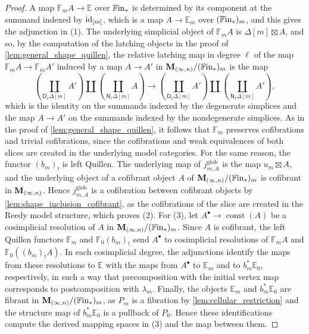 \documentclass[10pt,reqno]{amsart}
\begin{document}
\begin{proof}
A map $\mathbb F_mA\to\mathbb E$ over $\mathbb{F}\mathrm{in}_*$ is determined by
its component at the summand indexed by $\operatorname{id}_{[m]}$, which is a map
$A\to\mathbb E_m$ over $(\mathbb{F}\mathrm{in}_*)_m$, and this gives the
adjunction in \textup{(1)}. The underlying simplicial object of
$\mathbb F_mA$ is $\Delta[m]\boxtimes A$, and so, by the
computation of the latching objects in the proof of
\cref{lem:general_shape_quillen}, the relative latching map in degree
$\ell$ of the map $\mathbb F_mA\to\mathbb F_mA'$ induced by a map
$A\to A'$ in $\mathbf M_{(\infty,n)}/(\mathbb{F}\mathrm{in}_*)_m$ is the map
\[
\left(\coprod_{\mathsf D_\ell\Delta[m]}A'\right)
\amalg\left(\coprod_{\mathsf N_\ell\Delta[m]}A\right)
\longrightarrow
\left(\coprod_{\mathsf D_\ell\Delta[m]}A'\right)
\amalg\left(\coprod_{\mathsf N_\ell\Delta[m]}A'\right),
\]
which is the identity on the summands indexed by the degenerate
simplices and the map $A\to A'$ on the summands indexed by the
nondegenerate simplices. As in the proof of
\cref{lem:general_shape_quillen}, it follows that $\mathbb F_m$
preserves cofibrations and trivial cofibrations, since the
cofibrations and weak equivalences of both slices are created in the
underlying model categories. For the same reason, the functor
$(b_m)_!$ is left Quillen. The underlying map of
$j^{\mathrm{glob}}_{m,A}$ is the map $u_m\boxtimes A$, and the
underlying object of a cofibrant object $A$ of
$\mathbf M_{(\infty,n)}/(\mathbb{F}\mathrm{in}_*)_m$ is cofibrant in $\mathbf M_{(\infty,n)}$. Hence
$j^{\mathrm{glob}}_{m,A}$ is a cofibration between cofibrant objects
by \cref{lem:shape_inclusion_cofibrant}, as the cofibrations of the
slice are created in the Reedy model structure, which proves
\textup{(2)}.
For \textup{(3)}, let $A^\bullet\to\operatorname{const}(A)$ be a
cosimplicial resolution of $A$ in $\mathbf M_{(\infty,n)}/(\mathbb{F}\mathrm{in}_*)_m$. Since
$A$ is cofibrant, the left Quillen functors $\mathbb F_m$ and
$\mathbb F_0(b_m)_!$ send $A^\bullet$ to cosimplicial resolutions
of $\mathbb F_mA$ and $\mathbb F_0((b_m)_!A)$. In each cosimplicial
degree, the adjunctions identify the maps from these resolutions to
$\mathbb E$ with the maps from $A^\bullet$ to $\mathbb E_m$ and
to $b_m^*\mathbb E_0$, respectively, in such a way that
precomposition with the initial vertex map corresponds to
postcomposition with $\lambda_m$. Finally, the objects
$\mathbb E_m$ and $b_m^*\mathbb E_0$ are fibrant in
$\mathbf M_{(\infty,n)}/(\mathbb{F}\mathrm{in}_*)_m$, as $P_m$ is a fibration by
\cref{lem:cellular_restriction} and the structure map of
$b_m^*\mathbb E_0$ is a pullback of $P_0$. Hence these
identifications compute the derived mapping spaces in \textup{(3)}
and the map between them.
\end{proof}
\end{document}
